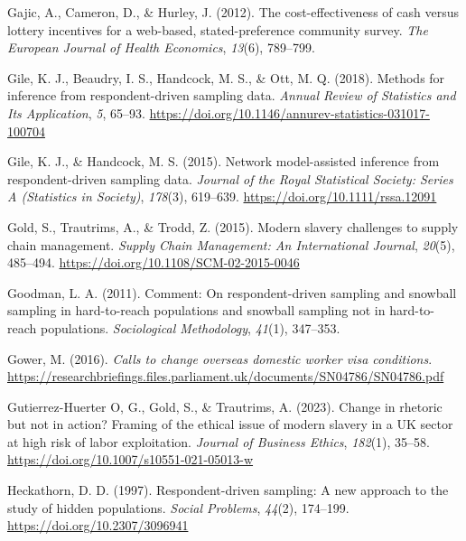 \documentclass[
  12pt,
]{article}
\newlength{\cslhangindent}
\newenvironment{CSLReferences}[2] %
 {\begin{list}{}{%
  \setlength{\itemindent}{0pt}
  \setlength{\leftmargin}{0pt}
  \setlength{\parsep}{0pt}
  \ifodd #1
   \setlength{\leftmargin}{\cslhangindent}
   \setlength{\itemindent}{-1\cslhangindent}
  \fi
  \setlength{\itemsep}{#2\baselineskip}}}
 {\end{list}}
\theoremstyle{plain}
\theoremstyle{definition}
\begin{document}
\begin{CSLReferences}{1}{0}
Gajic, A., Cameron, D., \& Hurley, J. (2012). The cost-effectiveness of
cash versus lottery incentives for a web-based, stated-preference
community survey. \emph{The European Journal of Health Economics},
\emph{13}(6), 789--799.

Gile, K. J., Beaudry, I. S., Handcock, M. S., \& Ott, M. Q. (2018).
Methods for inference from respondent-driven sampling data. \emph{Annual
Review of Statistics and Its Application}, \emph{5}, 65--93.
\url{https://doi.org/10.1146/annurev-statistics-031017-100704}

Gile, K. J., \& Handcock, M. S. (2015). Network model-assisted inference
from respondent-driven sampling data. \emph{Journal of the Royal
Statistical Society: Series A (Statistics in Society)}, \emph{178}(3),
619--639. \url{https://doi.org/10.1111/rssa.12091}

Gold, S., Trautrims, A., \& Trodd, Z. (2015). Modern slavery challenges
to supply chain management. \emph{Supply Chain Management: An
International Journal}, \emph{20}(5), 485--494.
\url{https://doi.org/10.1108/SCM-02-2015-0046}

Goodman, L. A. (2011). Comment: On respondent-driven sampling and
snowball sampling in hard-to-reach populations and snowball sampling not
in hard-to-reach populations. \emph{Sociological Methodology},
\emph{41}(1), 347--353.

Gower, M. (2016). \emph{Calls to change overseas domestic worker visa
conditions}.
\url{https://researchbriefings.files.parliament.uk/documents/SN04786/SN04786.pdf}

Gutierrez-Huerter O, G., Gold, S., \& Trautrims, A. (2023). Change in
rhetoric but not in action? Framing of the ethical issue of modern
slavery in a {UK} sector at high risk of labor exploitation.
\emph{Journal of Business Ethics}, \emph{182}(1), 35--58.
\url{https://doi.org/10.1007/s10551-021-05013-w}

Heckathorn, D. D. (1997). Respondent-driven sampling: A new approach to
the study of hidden populations. \emph{Social Problems}, \emph{44}(2),
174--199. \url{https://doi.org/10.2307/3096941}


\end{CSLReferences}
\end{document}
